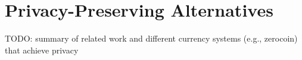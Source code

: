 \section{Privacy-Preserving Alternatives}
TODO: summary of related work and different currency systems (e.g., zerocoin) that achieve privacy